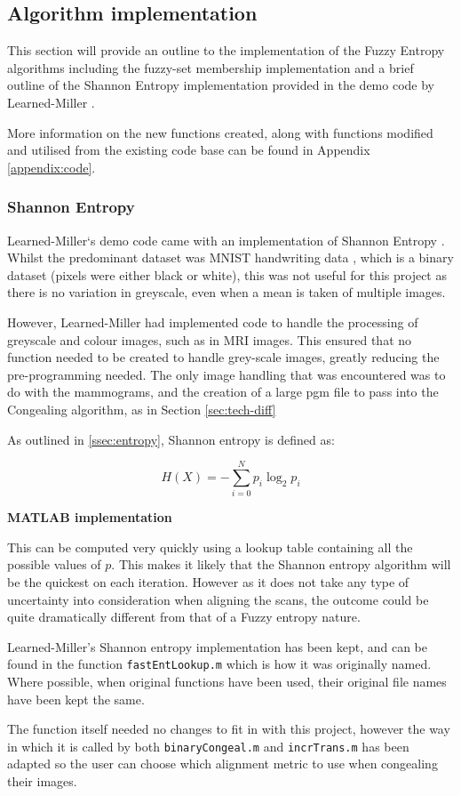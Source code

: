 \subsection{Algorithm implementation}

This section will provide an outline to the implementation of the Fuzzy Entropy algorithms including the fuzzy-set membership implementation and a brief outline of the Shannon Entropy implementation provided in the demo code by Learned-Miller \cite{joint-alignment}.

More information on the new functions created, along with functions modified and utilised from the existing code base can be found in Appendix \ref{appendix:code}.

\subsubsection{Shannon Entropy}
\label{ssec:shannon-entropy}

Learned-Miller`s demo code came with an implementation of Shannon Entropy \cite{joint-alignment}. Whilst the predominant dataset was MNIST handwriting data \cite{lecun1998gradientbased}, which is a binary dataset (pixels were either black or white), this was not useful for this project as there is no variation in greyscale, even when a mean is taken of multiple images.

However, Learned-Miller had implemented code to handle the processing of greyscale and colour images, such as in MRI images. This ensured that no function needed to be created to handle grey-scale images, greatly reducing the pre-programming needed. The only image handling that was encountered was to do with the mammograms, and the creation of a large pgm file to pass into the \Gls{Congealing} algorithm, as in Section \ref{sec:tech-diff}

As outlined in \ref{ssec:entropy}, Shannon entropy is defined as:

\begin{equation}
  H(X) = - \displaystyle\sum_{i=0}^{N}{p_i \log_2 p_i}
\end{equation}

\vspace{0.5cm}
\noindent \textbf{MATLAB implementation}

This can be computed very quickly using a lookup table containing all the possible values of $p$. This makes it likely that the Shannon entropy algorithm will be the quickest on each iteration. However as it does not take any type of uncertainty into consideration when aligning the scans, the outcome could be quite dramatically different from that of a Fuzzy entropy nature.

Learned-Miller's Shannon entropy implementation has been kept, and can be found in the function \texttt{fastEntLookup.m} which is how it was originally named. Where possible, when original functions have been used, their original file names have been kept the same.

The function itself needed no changes to fit in with this project, however the way in which it is called by both \texttt{binaryCongeal.m} and \texttt{incrTrans.m} has been adapted so the user can choose which alignment metric to use when congealing their images.
